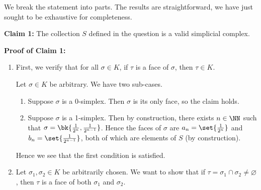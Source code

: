 \begin{sproof}[Sketch]
  We break the statement into parts. The results are straightforward,
  we have just sought to be exhaustive for completeness.
  \begin{leftbar}
    \textbf{Claim 1:} The collection $S$ defined in the question is a
    valid simplicial complex.

    \noindent \textbf{Proof of Claim 1:}
    \begin{enumerate}
      \item First, we verify that for all $\sigma \in K$, if $\tau$ is
        a face of $\sigma$, then $\tau \in K$.

        Let $\sigma \in K$ be arbitrary. We have two sub-cases.
        \begin{enumerate}[label=\arabic*)]
          \item Suppose $\sigma$ is a 0-simplex. Then $\sigma$ is its
            only face, so the claim holds.
          \item Suppose $\sigma$ is a 1-simplex. Then by construction,
            there exists $n \in \NN$ such that $\sigma =
            \bk{\frac{1}{2^n}, \frac{1}{2^{n-1}}}$. Hence the faces of
            $\sigma$ are $a_n = \set{\frac{1}{2^n}}$ and $b_n =
            \set{\frac{1}{2^{n-1}}}$, both of which are elements of $S$
            (by construction).
        \end{enumerate}
        Hence we see that the first condition is satisfied.
      \item Let $\sigma_1, \sigma_2 \in K$ be arbitrarily chosen. We
        want to show that if $\tau = \sigma_1 \cap \sigma_2 \neq
        \varnothing$, then $\tau$ is a face of both $\sigma_1$ and
        $\sigma_2$.


\end{enumerate}
\end{leftbar}
\end{sproof}
